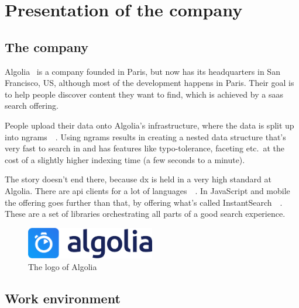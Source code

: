 
\chapter{Presentation of the company} %
\label{chp:presentation}

\section{The company} %
\label{sec:company}

Algolia~\cite{algolia-home} is a company founded in Paris, but now has its headquarters in San Francisco, US, although most of the development happens in Paris. Their goal is to help people discover content they want to find, which is achieved by a  \acrshort{saas} search offering.

People upload their data onto Algolia's infrastructure, where the data is split up into \glspl{ngram}~\cite{kimbrell1988searching}~. Using \glspl{ngram} results in creating a nested data structure that’s very fast to search in and has features like typo-tolerance, faceting etc.\ at  the cost of a slightly higher indexing time (a few seconds to a minute).\cite{paris-nlp-algolia}

The story doesn't end there, because \acrfull{dx} is held in a very high standard at Algolia. There are \acrshort{api} clients for a lot of languages~\cite{doc-api-clients}~. In JavaScript and mobile the offering goes further than that, by offering what’s called InstantSearch~\cite{instantsearch-js, react-instantsearch, instantsearch-android, instantsearch-ios}~. These are a set of libraries orchestrating all parts of a good search experience.

\begin{figure}[H]
  \centering
  \includegraphics[width=0.5\textwidth]{../assets/algolia-logo-light.pdf}
  \caption{The logo of Algolia~\cite{algolia-press}}
  \label{figure:company-logo}
\end{figure}

\section{Work environment}
\label{sec:work-environment}

